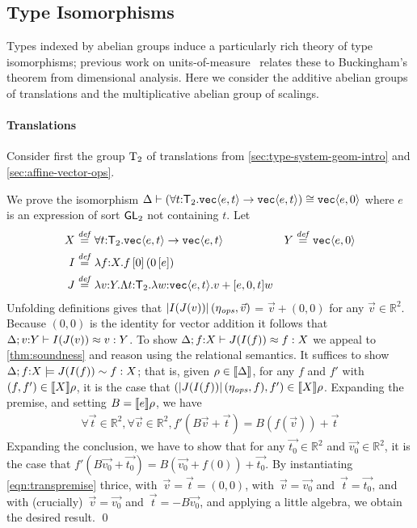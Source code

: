 \subsection{Type Isomorphisms}
\label{sec:types-indexed-abelian-groups}
Types indexed by abelian groups induce a particularly rich theory of
type isomorphisms; previous work on
units-of-measure~\cite{kennedy97relational} relates these to
Buckingham's theorem from dimensional analysis. Here we consider the
additive abelian groups of translations and the multiplicative abelian
group of scalings.

\paragraph{Translations} 
Consider first the group $\mathrm{T}_2$ of translations from
\autoref{sec:type-system-geom-intro} and 
\autoref{sec:affine-vector-ops}. 

\begin{example}\label{ex:simpletrans}
We prove the isomorphism
$\Delta\vdash(\forall t\mathord:\mathsf{T}_2.\textup{\texttt{vec}}\langle e,t \rangle\to\textup{\texttt{vec}}\langle e,t \rangle) \cong
\textup{\texttt{vec}}\langle e,0 \rangle$ where $e$ is an expression of sort $\mathsf{GL}_2$ not containing $t$.
Let 
\begin{align*}
X & \stackrel{\mathit{def}}=\forall t\mathord:\mathsf{T}_2.\textup{\texttt{vec}}\langle e,t \rangle\to\textup{\texttt{vec}}\langle e,t \rangle
&
Y & \stackrel{\mathit{def}}=\textup{\texttt{vec}}\langle e,0 \rangle\\
I & \stackrel{\mathit{def}}=\lambda f\mathord:X.f\,[0]\,(0\,[e])\\
J & \stackrel{\mathit{def}}=\lambda v\mathord:Y.\Lambda t\mathord:\mathsf{T}_2.\lambda w\mathord:\textup{\texttt{vec}}\langle e,t \rangle.v +[e,0,t] w
\end{align*}
Unfolding definitions gives that $\left| I(J(v))\right|(\eta_{\mathit{ops}},\vec{v})$ = $\vec{v}+(0,0)$
for any $\vec{v}\in\mathbb R ^ 2$.  Because $(0,0)$ is the identity for vector
addition it follows that ${\Delta};{v\mathord:Y}\vdash{I(J(v))}\approx{v}:{Y}$.
To show ${\Delta};{f\mathord:X}\vdash{J(I(f))}\approx{f}:{X}$ we appeal to
\autoref{thm:soundness} and reason using the relational semantics.  It
suffices to show ${\Delta};{f\mathord:X}\models{J(I(f))}\sim{f}:{X}$; that
is, given $\rho\in\llbracket \Delta \rrbracket$, for any $f$ and $f'$ with
$(f,f')\in\llbracket X \rrbracket\rho$, it is the case that 
$(\left| J(I(f))\right|(\eta_{\mathit{ops}},f), f')\in\llbracket X \rrbracket\rho$.
Expanding the premise, and setting $B = \llbracket e \rrbracket\rho$, we have
\begin{eqnarray}\label{eqn:transpremise}
\forall \vec{t}\in \mathbb R ^ 2,
\forall \vec{v}\in \mathbb R ^ 2,
f'(B\vec{v} + \vec{t}) = B(f(\vec{v})) + \vec{t}
\end{eqnarray}
Expanding the conclusion, we have to show that for any
$\vec{t_0}\in\mathbb R^2$ and $\vec{v_0}\in\mathbb R^2$, it is the case that
$f'(B\vec{v_0} + \vec{t_0}) = B(\vec{v_0} + f(0)) + \vec{t_0}$.
By instantiating \autoref{eqn:transpremise} thrice, with~$\vec{v}=\vec{t}=(0,0)$, with~$\vec{v}=\vec{v_0}$ and~$\vec{t}=\vec{t_0}$,
and with (crucially)~$\vec{v}=\vec{v_0}$ and~$\vec{t}=-B\vec{v_0}$, and applying a little algebra, we obtain
the desired result.
\qed
\end{example}

